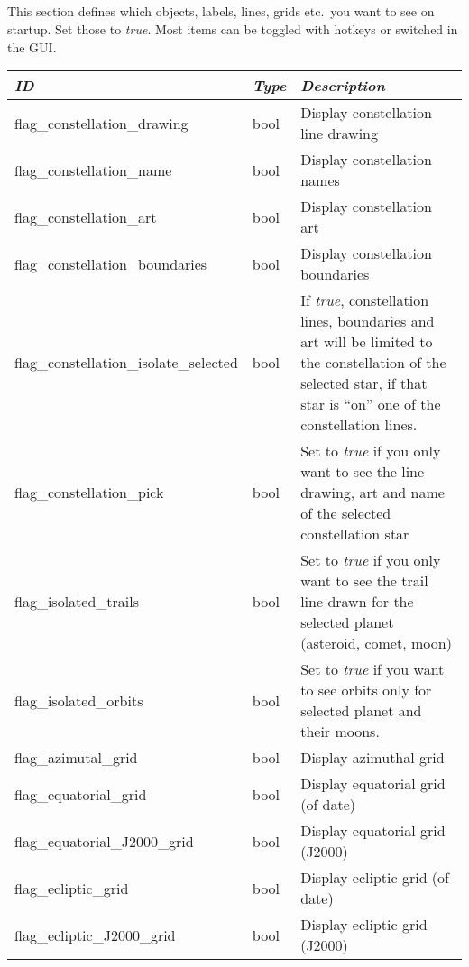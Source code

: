 \subsection{}\label{sec:config.ini:viewing}

This section defines which objects, labels, lines, grids etc.\ you
want to see on startup. Set those to \emph{true}. Most items can be
toggled with hotkeys or switched in the GUI.

\begin{longtabu} to \textwidth {l|l|X}
\toprule
\emph{ID} & \emph{Type} & \emph{Description}\\\midrule
flag\_constellation\_drawing    & bool  & Display constellation line drawing\\\midrule
flag\_constellation\_name       & bool  & Display constellation names\\\midrule
flag\_constellation\_art        & bool  & Display constellation art\\\midrule
flag\_constellation\_boundaries & bool  & Display constellation boundaries \\\midrule
flag\_constellation\_isolate\_selected  & bool & If \emph{true}, constellation lines, boundaries and art will be limited to the constellation of the selected star, 
                                                 if that star is ``on'' one of the constellation lines.\\\midrule
flag\_constellation\_pick     & bool & Set to \emph{true} if you only want to see the line drawing, art and name of the selected constellation star\\\midrule
flag\_isolated\_trails        & bool & Set to \emph{true} if you only want to see the trail line drawn for the selected planet (asteroid, comet, moon)\\\midrule
flag\_isolated\_orbits        & bool & Set to \emph{true} if you want to see orbits only for selected planet and their moons.\\\midrule
flag\_azimutal\_grid          & bool & Display azimuthal grid \\\midrule
flag\_equatorial\_grid        & bool & Display equatorial grid (of date) \\\midrule
flag\_equatorial\_J2000\_grid & bool & Display equatorial grid (J2000) \\\midrule
flag\_ecliptic\_grid          & bool & Display ecliptic grid (of date) \\\midrule
flag\_ecliptic\_J2000\_grid   & bool & Display ecliptic grid (J2000) \\\midrule

\end{longtabu}
